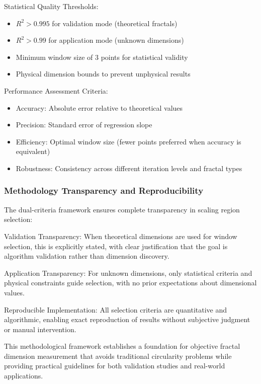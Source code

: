 \documentclass[preprint,12pt]{elsarticle}
\def\textbf#1{#1}%
\begin{document}
\textbf{Statistical Quality Thresholds}:
\begin{itemize}
\item $R^2 > 0.995$ for validation mode (theoretical fractals)
\item $R^2 > 0.99$ for application mode (unknown dimensions)
\item Minimum window size of 3 points for statistical validity
\item Physical dimension bounds to prevent unphysical results
\end{itemize}

\textbf{Performance Assessment Criteria}:
\begin{itemize}
\item \textbf{Accuracy}: Absolute error relative to theoretical values
\item \textbf{Precision}: Standard error of regression slope
\item \textbf{Efficiency}: Optimal window size (fewer points preferred when accuracy is equivalent)
\item \textbf{Robustness}: Consistency across different iteration levels and fractal types
\end{itemize}

\subsubsection{Methodology Transparency and Reproducibility}

The dual-criteria framework ensures complete transparency in scaling region selection:

\textbf{Validation Transparency}: When theoretical dimensions are used for window selection, this is explicitly stated, with clear justification that the goal is algorithm validation rather than dimension discovery.

\textbf{Application Transparency}: For unknown dimensions, only statistical criteria and physical constraints guide selection, with no prior expectations about dimensional values.

\textbf{Reproducible Implementation}: All selection criteria are quantitative and algorithmic, enabling exact reproduction of results without subjective judgment or manual intervention.

This methodological framework establishes a foundation for objective fractal dimension measurement that avoids traditional circularity problems while providing practical guidelines for both validation studies and real-world applications.
\end{document}
